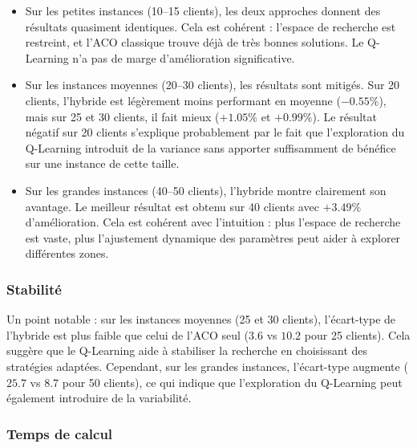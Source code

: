 \documentclass[12pt, a4paper]{article}
\begin{document}
\begin{itemize}
    \item Sur les petites instances (10--15 clients), les deux approches donnent des résultats quasiment identiques. Cela est cohérent : l'espace de recherche est restreint, et l'ACO classique trouve déjà de très bonnes solutions. Le Q-Learning n'a pas de marge d'amélioration significative.

    \item Sur les instances moyennes (20--30 clients), les résultats sont mitigés. Sur 20 clients, l'hybride est légèrement moins performant en moyenne ($-0.55\%$), mais sur 25 et 30 clients, il fait mieux ($+1.05\%$ et $+0.99\%$). Le résultat négatif sur 20 clients s'explique probablement par le fait que l'exploration du Q-Learning introduit de la variance sans apporter suffisamment de bénéfice sur une instance de cette taille.

    \item Sur les grandes instances (40--50 clients), l'hybride montre clairement son avantage. Le meilleur résultat est obtenu sur 40 clients avec $+3.49\%$ d'amélioration. Cela est cohérent avec l'intuition : plus l'espace de recherche est vaste, plus l'ajustement dynamique des paramètres peut aider à explorer différentes zones.
\end{itemize}

\subsubsection{Stabilité}

Un point notable : sur les instances moyennes (25 et 30 clients), l'écart-type de l'hybride est plus faible que celui de l'ACO seul ($3.6$ vs $10.2$ pour 25 clients). Cela suggère que le Q-Learning aide à stabiliser la recherche en choisissant des stratégies adaptées. Cependant, sur les grandes instances, l'écart-type augmente ($25.7$ vs $8.7$ pour 50 clients), ce qui indique que l'exploration du Q-Learning peut également introduire de la variabilité.

\subsubsection{Temps de calcul}
\end{document}
